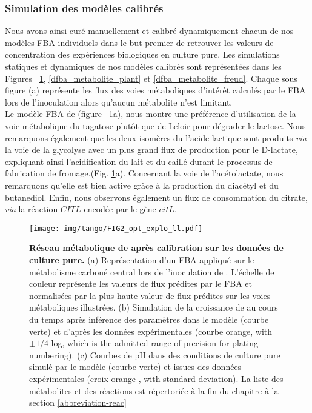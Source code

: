 \subsubsection*{Simulation des modèles calibrés}

Nous avons ainsi curé manuellement et calibré dynamiquement chacun de nos modèles FBA individuels dans le but premier de retrouver les valeurs de concentration des expériences biologiques en culture pure. Les simulations statiques et dynamiques de nos modèles calibrés sont représentées dans les Figures ~\ref{dfba_metabolite_lactis}, \ref{dfba_metabolite_plant} et \ref{dfba_metabolite_freud}. Chaque sous figure (a) représente les flux des voies métaboliques d'intérêt calculés par le FBA lors de l'inoculation alors qu'aucun métabolite n'est limitant. \\

Le modèle FBA de \lactis (figure ~\ref{dfba_metabolite_lactis}a), nous montre une préférence d'utilisation de la voie métabolique du tagatose plutôt que de Leloir pour dégrader le lactose. Nous remarquons également que les deux isomères du l'acide lactique sont produits \textit{via} la voie de la glycolyse avec un plus grand flux de production pour le D-lactate, expliquant ainsi l'acidification du lait et du caillé durant le processus de fabrication de fromage.(Fig. \ref{dfba_metabolite_lactis}a). Concernant la voie de l'acétolactate, nous remarquons qu'elle est bien active grâce à la production du diacétyl et du butanediol. Enfin, nous observons également un flux de consommation du citrate, \textit{via} la réaction $CITL$ encodée par le gène $citL$. \\

\begin{figure}[h!]
    \centering
    \texttt{[image: img/tango/FIG2\_opt\_explo\_ll.pdf]}
    \caption{\textbf{ Réseau métabolique de \lactis après calibration sur les données de culture pure.} (a) Représentation d'un FBA appliqué sur le métabolisme carboné central lors de l'inoculation de \lactis. L'échelle de couleur représente les valeurs de flux prédites par le FBA et normalisées par la plus haute valeur de flux prédites sur les voies métaboliques illustrées. (b) Simulation de la croissance de \lactis au cours du temps après inférence des paramètres dans le modèle (courbe verte) et d'après les données expérimentales (courbe orange, with $\pm 1/4$ log, which is the admitted range of precision for plating numbering). (c) Courbes de pH dans des conditions de culture pure simulé par le modèle (courbe verte) et issues des données expérimentales (croix orange , with standard deviation). La liste des métabolites et des réactions est répertoriée à la fin du chapitre à la section \ref{abbreviation-reac}}
    \label{dfba_metabolite_lactis}
\end{figure}

